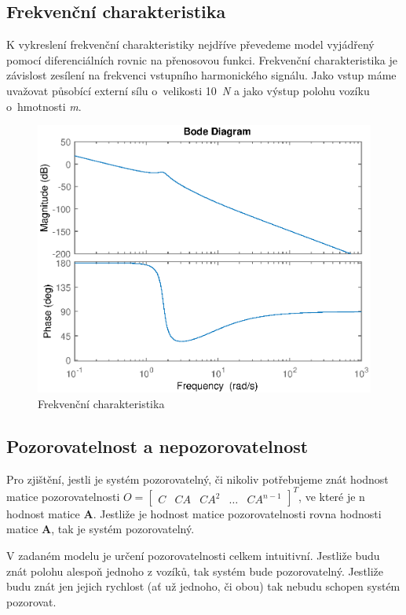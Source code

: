 \subsection{Frekvenční charakteristika}

K vykreslení frekvenční charakteristiky nejdříve převedeme model vyjádřený pomocí diferenciálních rovnic na přenosovou funkci. Frekvenční charakteristika je závislost zesílení na frekvenci vstupního harmonického signálu. Jako vstup máme uvažovat působící externí sílu o~velikosti 10~\textit{N} a jako výstup polohu vozíku o~hmotnosti \textit{m}.

\begin{figure}[htbp]
	\centering
	\includegraphics[scale=0.7]{graphs/bode.eps}
	\caption{Frekvenční charakteristika}
\end{figure}
\FloatBarrier

\subsection{Pozorovatelnost a nepozorovatelnost}

Pro zjištění, jestli je systém pozorovatelný, či nikoliv potřebujeme znát hodnost matice pozorovatelnosti \( O = \begin{bmatrix} C & CA & CA^2 & \ldots & CA^{n-1} \end{bmatrix}^T \), ve které je n hodnost matice \textbf{A}. Jestliže je hodnost matice pozorovatelnosti rovna hodnosti matice \textbf{A}, tak je systém pozorovatelný. 

V zadaném modelu je určení pozorovatelnosti celkem intuitivní. Jestliže budu znát polohu alespoň jednoho z vozíků, tak systém bude pozorovatelný. Jestliže budu znát jen jejich rychlost (ať už jednoho, či obou) tak nebudu schopen systém pozorovat.

